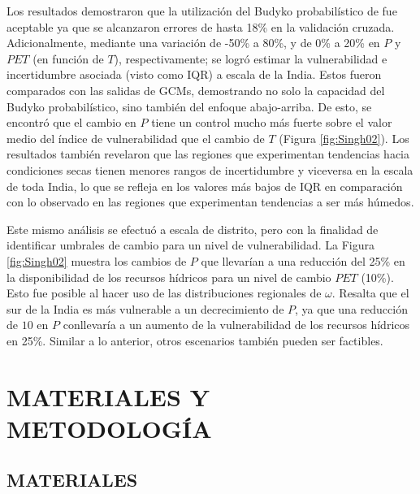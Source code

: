 \documentclass[12pt]{article}
\begin{document}
Los resultados demostraron que la utilización del Budyko probabilístico de \citet{Singh2015} fue aceptable ya que se alcanzaron errores de hasta 18\% en la validación cruzada. Adicionalmente, mediante una variación de -50\% a 80\%, y de 0\% a 20\% en $P$ y $PET$ (en función de $T$), respectivamente; se logró estimar la vulnerabilidad e incertidumbre asociada (visto como IQR) a escala de la India. Estos fueron comparados con las salidas de GCMs, demostrando no solo la capacidad del Budyko probabilístico, sino también del enfoque abajo-arriba. De esto, se encontró que el cambio en $P$ tiene un control mucho más fuerte sobre el valor medio del índice de vulnerabilidad que el cambio de $T$ (Figura \ref{fig:Singh02}). Los resultados también revelaron que las regiones que experimentan tendencias hacia condiciones secas tienen menores rangos de incertidumbre y viceversa en la escala de toda India, lo que se refleja en los valores más bajos de IQR en comparación con lo observado en las regiones que experimentan tendencias a ser más húmedos.

Este mismo análisis se efectuó a escala de distrito, pero con la finalidad de identificar umbrales de cambio para un nivel de vulnerabilidad. La Figura \ref{fig:Singh02} muestra los cambios de $P$ que llevarían a una reducción del 25\% en la disponibilidad de los recursos hídricos para un nivel de cambio $PET$ (10\%). Esto fue posible al hacer uso de las distribuciones regionales de $\omega$. Resalta que el sur de la India es más vulnerable a un decrecimiento de $P$, ya que una reducción de $10$ en $P$ conllevaría a un aumento de la vulnerabilidad de los recursos hídricos en 25\%. Similar a lo anterior, otros escenarios también pueden ser factibles. 

\clearpage

\clearpage

\clearpage
\vspace*{0.5mm}
\section{MATERIALES Y METODOLOGÍA}

\thispagestyle{empty}

\subsection{MATERIALES}
\end{document}
